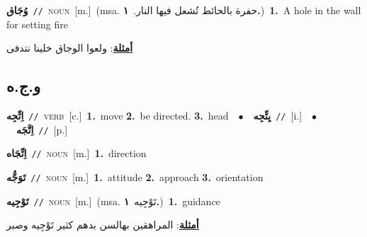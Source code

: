\documentclass[10pt,a4paper,twoside]{article} %
\begin{document}
\begin{multicols}{2}
{{{{{{{{{{{\setlength\topsep{0pt}\textbf{\foreignlanguage{arabic}{وُجَاق}}\ {\color{gray}\texttt{//}\color{black}}\ \textsc{noun}\ [m.]\ \color{gray}(msa. \foreignlanguage{arabic}{حفرة بالحائط تُشعل فيها النار.}~\foreignlanguage{arabic}{\textbf{١.}})\color{black}\ \textbf{1.}~A hole in the wall for setting fire\  \begin{flushright}\color{gray}\foreignlanguage{arabic}{\textbf{\underline{\foreignlanguage{arabic}{أمثلة}}}: ولعوا الوجاق خلينا نتدفى}\end{flushright}\color{black}} \vspace{2mm}

\vspace{-3mm}
\subsection*{\color{blue}\foreignlanguage{arabic}{و.ج.ه}\color{blue}{}} 

{\setlength\topsep{0pt}\textbf{\foreignlanguage{arabic}{اِتِّجِه}}\ {\color{gray}\texttt{//}\color{black}}\ \textsc{verb}\ [c.]\ \textbf{1.}~move  \textbf{2.}~be directed.  \textbf{3.}~head\ \ $\bullet$\ \ \setlength\topsep{0pt}\textbf{\foreignlanguage{arabic}{يِتِّجِه}}\ {\color{gray}\texttt{//}\color{black}}\ [i.]\ \ $\bullet$\ \ \setlength\topsep{0pt}\textbf{\foreignlanguage{arabic}{اِتَّجَه}}\ {\color{gray}\texttt{//}\color{black}}\ [p.]\ 

{\setlength\topsep{0pt}\textbf{\foreignlanguage{arabic}{اِتِّجَاه}}\ {\color{gray}\texttt{//}\color{black}}\ \textsc{noun}\ [m.]\ \textbf{1.}~direction\ 

{\setlength\topsep{0pt}\textbf{\foreignlanguage{arabic}{تَوَجُّه}}\ {\color{gray}\texttt{//}\color{black}}\ \textsc{noun}\ [m.]\ \textbf{1.}~attitude  \textbf{2.}~approach  \textbf{3.}~orientation\ 

{\setlength\topsep{0pt}\textbf{\foreignlanguage{arabic}{تَوْجِيه}}\ {\color{gray}\texttt{//}\color{black}}\ \textsc{noun}\ [m.]\ \color{gray}(msa. \foreignlanguage{arabic}{تَوْجِيه}~\foreignlanguage{arabic}{\textbf{١.}})\color{black}\ \textbf{1.}~guidance\  \begin{flushright}\color{gray}\foreignlanguage{arabic}{\textbf{\underline{\foreignlanguage{arabic}{أمثلة}}}: المراهقين بهالسن بدهم كثير تَوْجِيه وصبر}\end{flushright}\color{black}} \vspace{2mm}

}}}}}}}}}}}}}
\end{multicols}
\end{document}
